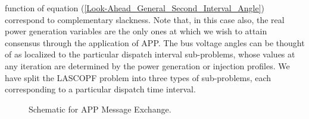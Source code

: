 \documentclass[preprint,12pt,3p]{elsarticle}
\begin{document}
function of equation (\ref{Look-Ahead_General_Second_Interval_Angle}) correspond to complementary slackness. Note that, in this case also, the real power generation variables are the only ones at which we wish to attain consensus through the application of APP. The bus voltage angles can be thought of as localized to the particular dispatch interval sub-problems, whose values at any iteration are determined by the power generation or injection profiles. We have split the LASCOPF problem into three types of sub-problems, each corresponding to a particular dispatch time interval.\\
\begin{figure}
\setlength{\unitlength}{0.4\linewidth}
{}
\parbox[b]{0.3\linewidth}{
\caption[Schematic for APP Message Exchange.]
{Schematic for APP Message Exchange.}
\label{Schematic_for_APP_Message_Exchange_Appendix}
}
\end{figure}
\end{document}
